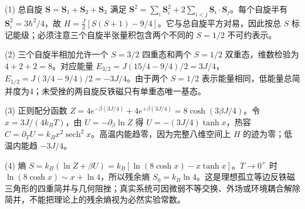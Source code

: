 (1) 总自旋 \(\boldsymbol S=\boldsymbol S_1+\boldsymbol S_2+\boldsymbol S_3\) 满足 \(\boldsymbol S^2=\sum_i\boldsymbol S_i^2+2\sum_{i<j}\boldsymbol S_i\cdot\boldsymbol S_j\)。每个自旋半有 \(\boldsymbol S_i^2=3\hbar^2/4\)，故 \(H=\frac J2[S(S+1)-9/4]\)。它与总自旋平方对易，因此按总 \(S\) 标记能级；必须注意三个自旋半张量积包含两个不同的 \(S=1/2\) 不可约表示。

(2) 三个自旋半相加允许一个 \(S=3/2\) 四重态和两个 \(S=1/2\) 双重态，维数检验为 \(4+2+2=8\)。对应能量 \(E_{3/2}=J(15/4-9/4)/2=3J/4\)，\(E_{1/2}=J(3/4-9/4)/2=-3J/4\)。由于两个 \(S=1/2\) 表示能量相同，低能量总简并度为4；未受挫的两自旋反铁磁只有单重态唯一基态。

(3) 正则配分函数 \(Z=4e^{-\beta(3J/4)}+4e^{+\beta(3J/4)}=8\cosh(3\beta J/4)\)。令 \(x=3J/(4k_BT)\)，由 \(U=-\partial_\beta\ln Z\) 得 \(U=-(3J/4)\tanh x\)，热容 \(C=\partial_T U=k_B x^2\operatorname{sech}^2x\)。高温内能趋零，因为完整八维空间上 \(H\) 的迹为零；低温内能趋 \(-3J/4\)。

(4) 熵 \(S=k_B(\ln Z+\beta U)=k_B[\ln(8\cosh x)-x\tanh x]\)。\(T\to0^+\) 时 \(\ln(8\cosh x)\sim x+\ln4\)，所以残余熵 \(S_0=k_B\ln4\)。这是理想孤立等边反铁磁三角形的四重简并与几何阻挫；真实系统可因微弱不等交换、外场或环境耦合解除简并，不能把理论上的残余熵视为必然实验常数。
